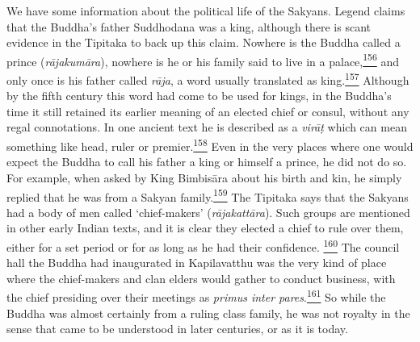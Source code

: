 We have some information about the political life of the Sakyans. Legend
claims that the Buddha's father Suddhodana was a king, although there is
scant evidence in the Tipitaka to back up this claim. Nowhere is the
Buddha called a prince (\emph{rājakumāra}), nowhere is he or his family
said to live in a
palace,\label{footprints_split_008.html_fnref156}\hyperref[footprints_split_024.htmlux5cux23fn156]{\textsuperscript{156}}
and only once is his father called \emph{rāja}, a word usually
translated as
king.\label{footprints_split_008.html_fnref157}\hyperref[footprints_split_024.htmlux5cux23fn157]{\textsuperscript{157}}
Although by the fifth century this word had come to be used for kings,
in the Buddha's time it still retained its earlier meaning of an elected
chief or consul, without any regal connotations. In one ancient text he
is described as a \emph{virāṭ} which can mean something like head, ruler
or
premier.\label{footprints_split_008.html_fnref158}\hyperref[footprints_split_024.htmlux5cux23fn158]{\textsuperscript{158}}
Even in the very places where one would expect the Buddha to call his
father a king or himself a prince, he did not do so. For example, when
asked by King Bimbisāra about his birth and kin, he simply replied that
he was from a Sakyan
family.\label{footprints_split_008.html_fnref159}\hyperref[footprints_split_024.htmlux5cux23fn159]{\textsuperscript{159}}
The Tipitaka says that the Sakyans had a body of men called
`chief-makers' (\emph{rājakattāra}). Such groups are mentioned in other
early Indian texts, and it is clear they elected a chief to rule over
them, either for a set period or for as long as he had their confidence.
\label{footprints_split_008.html_fnref160}\hyperref[footprints_split_024.htmlux5cux23fn160]{\textsuperscript{160}}
The council hall the Buddha had inaugurated in Kapilavatthu was the very
kind of place where the chief-makers and clan elders would gather to
conduct business, with the chief presiding over their meetings as
\emph{primus inter
pares}.\label{footprints_split_008.html_fnref161}\hyperref[footprints_split_024.htmlux5cux23fn161]{\textsuperscript{161}}
So while the Buddha was almost certainly from a ruling class family, he
was not royalty in the sense that came to be understood in later
centuries, or as it is today.

